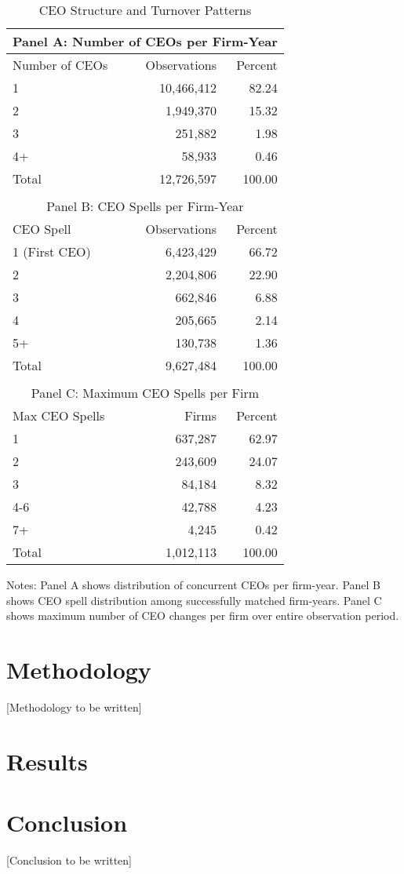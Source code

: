 \documentclass[11pt,a4paper]{article}
\begin{document}
\begin{table}[htbp]
\centering
\caption{CEO Structure and Turnover Patterns}
\label{tab:ceo_structure}
\begin{tabular}{lrr}
\toprule
\multicolumn{3}{c}{Panel A: Number of CEOs per Firm-Year} \\
\midrule
Number of CEOs & Observations & Percent \\
\midrule
1 & 10,466,412 & 82.24 \\
2 & 1,949,370 & 15.32 \\
3 & 251,882 & 1.98 \\
4+ & 58,933 & 0.46 \\
\midrule
Total & 12,726,597 & 100.00 \\
\\[0.5em]
\multicolumn{3}{c}{Panel B: CEO Spells per Firm-Year} \\
\midrule
CEO Spell & Observations & Percent \\
\midrule
1 (First CEO) & 6,423,429 & 66.72 \\
2 & 2,204,806 & 22.90 \\
3 & 662,846 & 6.88 \\
4 & 205,665 & 2.14 \\
5+ & 130,738 & 1.36 \\
\midrule
Total & 9,627,484 & 100.00 \\
\\[0.5em]
\multicolumn{3}{c}{Panel C: Maximum CEO Spells per Firm} \\
\midrule
Max CEO Spells & Firms & Percent \\
\midrule
1 & 637,287 & 62.97 \\
2 & 243,609 & 24.07 \\
3 & 84,184 & 8.32 \\
4-6 & 42,788 & 4.23 \\
7+ & 4,245 & 0.42 \\
\midrule
Total & 1,012,113 & 100.00 \\
\bottomrule
\end{tabular}
\footnotesize
Notes: Panel A shows distribution of concurrent CEOs per firm-year. Panel B shows CEO spell distribution among successfully matched firm-years. Panel C shows maximum number of CEO changes per firm over entire observation period.
\end{table}

\section{Methodology}

[Methodology to be written]

\section{Results}





\section{Conclusion}

[Conclusion to be written]



\end{document}
